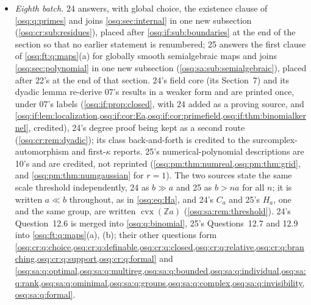 \documentclass[11pt,letterpaper]{article}
\numberwithin{equation}{section}
\theoremstyle{definition}
\theoremstyle{remark}
\theoremstyle{plain}
\newcommand{\Z}{\mathbb Z}
\begin{document}
\begin{itemize}
earlier statement is renumbered. 20's multiquadratic lemma, which 23 reproves, is printed once under 20's label with 23 added as a proving
source (\cref{osq:bb:lem:multiquadratic}); the first equality of 20's rational slice (\cref{osq:bb:thm:rational}) is contained in 23's
Gaussian and fixed-ideal corollary (\cref{osq:rm:cor:rational}), and 23 credits it. The independent family of size $2^{\aleph_0}$ in the reduced
cyclic fibre is 20's (\cref{osq:bb:thm:rank} with $G=\{0\}$), which 23 did not cite; 23's own family is kept. Its Puiseux radicality is kept with
19's finite-axiom theorem as a second route (\cref{osq:rm:rem:puiabstract}). Two of its questions are merged into \cref{osq:nf:q:fibre}(b), (c),
and its other seven form \cref{osq:rm:q:fullQ,osq:rm:q:boolean,osq:rm:q:gluing,osq:rm:q:arhomology,osq:rm:q:completion,osq:rm:q:nonmonomial,osq:rm:q:formal}.
\item \emph{Eighth batch.} 24 answers, with global choice, the existence clause of \cref{osq:q:primes} and joins \cref{osq:sec:internal} in one new
subsection (\cref{osq:cr:sub:residues}), placed after \cref{osq:if:sub:boundaries} at the end of the section so that no earlier statement is renumbered;
25 answers the first clause of \cref{osq:ft:q:maps}(a) for globally smooth semialgebraic maps and joins \cref{osq:sec:polynomial} in one new subsection
(\cref{osq:sa:sub:semialgebraic}), placed after 22's at the end of that section. 24's field core (its Section~7) and its dyadic lemma re-derive 07's
results in a weaker form and are printed once, under 07's labels (\cref{osq:if:prop:closed}, with 24 added as a proving source, and
\cref{osq:if:lem:localization,osq:if:cor:Ea,osq:if:cor:primefield,osq:if:thm:binomialkernel}, credited), 24's degree proof being kept as a second route
(\cref{osq:cr:rem:dyadic}); its class back-and-forth is credited to the surcomplex-automorphism and first-$\kappa$ reports. 25's numerical-polynomial
descriptions are 10's and are credited, not reprinted (\cref{osq:pm:thm:numreal,osq:pm:thm:grid}, and \cref{osq:pm:thm:numgaussian} for $r=1$). The two sources
state the same scale threshold independently, 24 as $b\gg a$ and 25 as $b>na$ for all $n$; it is written $a\ll b$ throughout, as in \eqref{osq:eq:Ha},
and 24's $C_a$ and 25's $H_a$, one and the same group, are written $\operatorname{cvx}(\Z a)$ (\cref{osq:sa:rem:threshold}). 24's Question~12.6 is
merged into \cref{osq:q:binomial}, 25's Questions~12.7 and 12.9 into \cref{osq:ft:q:maps}(a), (b); their other questions form
\cref{osq:cr:q:choice,osq:cr:q:definable,osq:cr:q:closed,osq:cr:q:relative,osq:cr:q:branching,osq:cr:q:support,osq:cr:q:formal} and
\cref{osq:sa:q:optimal,osq:sa:q:multireg,osq:sa:q:bounded,osq:sa:q:individual,osq:sa:q:rank,osq:sa:q:ominimal,osq:sa:q:groups,osq:sa:q:complex,osq:sa:q:invisibility,osq:sa:q:formal}.
\end{itemize}
\end{document}
